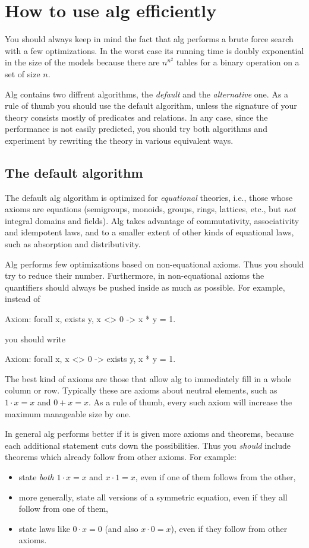\documentclass{article}
\begin{document}
\section{How to use alg efficiently}
\label{sec:optimization}

You should always keep in mind the fact that alg performs a brute
force search with a few optimizations. In the worst case its running
time is doubly exponential in the size of the models because there are
$n^{n^2}$ tables for a binary operation on a set of size $n$.

Alg contains two diffrent algorithms, the \emph{default} and the
\emph{alternative} one. As a rule of thumb you should use the
default algorithm, unless the signature of your theory consists mostly
of predicates and relations. In any case, since the performance is not
easily predicted, you should try both algorithms and experiment by
rewriting the theory in various equivalent ways.

\subsection{The default algorithm}
\label{sec:default-algorithm}

The default alg algorithm is optimized for \emph{equational} theories,
i.e., those whose axioms are equations (semigroups, monoids, groups,
rings, lattices, etc., but \emph{not} integral domains and fields).
Alg takes advantage of commutativity, associativity and idempotent
laws, and to a smaller extent of other kinds of equational laws, such
as absorption and distributivity.

Alg performs few optimizations based on non-equational axioms. Thus
you should try to reduce their number. Furthermore, in non-equational
axioms the quantifiers should always be pushed inside as much as
possible. For example, instead of
%
\begin{shell}
Axiom: forall x, exists y, x <> 0 -> x * y = 1.
\end{shell}
%
you should write
%
\begin{shell}
Axiom: forall x, x <> 0 -> exists y, x * y = 1.
\end{shell}
%
The best kind of axioms are those that allow alg to immediately fill in
a whole column or row. Typically these are axioms about neutral
elements, such as $1 \cdot x = x$ and $0 + x = x$. As a rule of thumb,
every such axiom will increase the maximum manageable size by one.

In general alg performs better if it is given more axioms and
theorems, because each additional statement cuts down the
possibilities. Thus you \emph{should} include theorems which already
follow from other axioms. For example:
%
\begin{itemize}
\item state \emph{both} $1 \cdot x = x$ and $x \cdot 1 = x$, even if
  one of them follows from the other,
\item more generally, state all versions of a symmetric equation, even
  if they all follow from one of them,
\item state laws like $0 \cdot x = 0$ (and also $x \cdot 0 = x$), even
  if they follow from other axioms.
\end{itemize}
\end{document}
